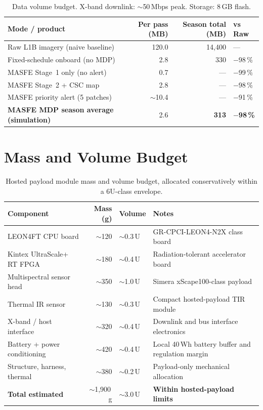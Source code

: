 \begin{table}[htb]
  \centering
  \caption{Data volume budget. X-band downlink: $\sim$50\,Mbps peak. Storage: 8\,GB flash.}
  \small
  \begin{tabularx}{\textwidth}{p{4.5cm}rrX}
    \toprule
    \textbf{Mode / product} & \textbf{Per pass (MB)} & \textbf{Season total (MB)} & \textbf{vs Raw} \\
    \midrule
    Raw L1B imagery (naive baseline) & 120.0 & 14{,}400 & --- \\
    Fixed-schedule onboard (no MDP)  &   2.8 &      330 & $-$98\,\% \\
    MASFE Stage~1 only (no alert)    &   0.7 &       ---& $-$99\,\% \\
    MASFE Stage~2 + CSC map          &   2.8 &       ---& $-$98\,\% \\
    MASFE priority alert (5 patches) & $\sim$10.4 &  ---& $-$91\,\% \\
    \midrule
    \textbf{MASFE MDP season average (simulation)} & 2.6 & \textbf{313} & \textbf{$-$98\,\%} \\
    \bottomrule
  \end{tabularx}
\end{table}

\section*{Mass and Volume Budget}

\begin{table}[htb]
  \centering
  \caption{Hosted payload module mass and volume budget, allocated conservatively within a 6U-class envelope.}
  \small
  \begin{tabularx}{\textwidth}{p{4.5cm}rp{2.0cm}X}
    \toprule
    \textbf{Component} & \textbf{Mass (g)} & \textbf{Volume} & \textbf{Notes} \\
    \midrule
    LEON4FT CPU board          & $\sim$120  & $\sim$0.3\,U & GR-CPCI-LEON4-N2X class board \\
    Kintex UltraScale+ RT FPGA & $\sim$180  & $\sim$0.4\,U & Radiation-tolerant accelerator board \\
    Multispectral sensor head  & $\sim$350  & $\sim$1.0\,U & Simera xScape100-class payload \\
    Thermal IR sensor          & $\sim$130  & $\sim$0.3\,U & Compact hosted-payload TIR module \\
    X-band / host interface    & $\sim$320  & $\sim$0.4\,U & Downlink and bus interface electronics \\
    Battery + power conditioning & $\sim$420 & $\sim$0.4\,U & Local 40\,Wh battery buffer and regulation margin \\
    Structure, harness, thermal & $\sim$380 & $\sim$0.2\,U & Payload-only mechanical allocation \\
    \midrule
    \textbf{Total estimated}   & $\sim$1{,}900\,g & $\sim$3.0\,U & \textbf{Within hosted-payload limits} \\
    \bottomrule
  \end{tabularx}
\end{table}

